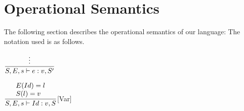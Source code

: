 
\section{Operational Semantics}
The following section describes the operational semantics of our language:
The notation used is as follows.

\hspace*{10em} $\dfrac{
\vdots
}{S, E, s \vdash{}e:v,S^{\prime}}$ \bigskip

\hspace*{10em} $\dfrac{
\begin{array}{l}
    E(Id) = l \\
    S(l) = v
\end{array}
}{S, E, s \vdash{} Id:v,S }$[Var]\bigskip

